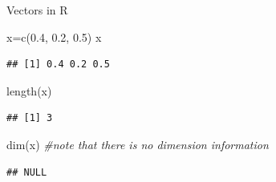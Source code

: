\documentclass[
  ignorenonframetext,
]{beamer}
\newenvironment{Shaded}{\begin{snugshade}}{\end{snugshade}}
\newcommand{\CommentTok}[1]{\textcolor[rgb]{0.56,0.35,0.01}{\textit{#1}}}
\newcommand{\FloatTok}[1]{\textcolor[rgb]{0.00,0.00,0.81}{#1}}
\newcommand{\FunctionTok}[1]{\textcolor[rgb]{0.00,0.00,0.00}{#1}}
\newcommand{\NormalTok}[1]{#1}
\newcommand{\OtherTok}[1]{\textcolor[rgb]{0.56,0.35,0.01}{#1}}
\begin{document}
\begin{frame}[fragile]{Vectors in R}
\protect\hypertarget{vectors-in-r-1}{}
\begin{Shaded}
\begin{Highlighting}[]
\NormalTok{x}\OtherTok{=}\FunctionTok{c}\NormalTok{(}\FloatTok{0.4}\NormalTok{, }\FloatTok{0.2}\NormalTok{, }\FloatTok{0.5}\NormalTok{)}
\NormalTok{x}
\end{Highlighting}
\end{Shaded}

\begin{verbatim}
## [1] 0.4 0.2 0.5
\end{verbatim}

\begin{Shaded}
\begin{Highlighting}[]
\FunctionTok{length}\NormalTok{(x)}
\end{Highlighting}
\end{Shaded}

\begin{verbatim}
## [1] 3
\end{verbatim}

\begin{Shaded}
\begin{Highlighting}[]
\FunctionTok{dim}\NormalTok{(x) }\CommentTok{\#note that there is no dimension information}
\end{Highlighting}
\end{Shaded}

\begin{verbatim}
## NULL
\end{verbatim}
\end{frame}
\end{document}
